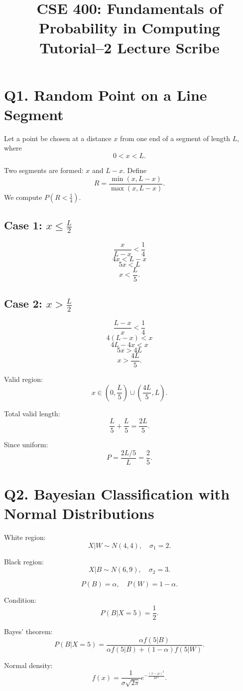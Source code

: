 \documentclass[12pt]{article}
\title{CSE 400: Fundamentals of Probability in Computing\\
Tutorial--2 Lecture Scribe}
\date{}
\begin{document}
\maketitle

\section*{Q1. Random Point on a Line Segment}

Let a point be chosen at a distance $x$ from one end of a segment of length $L$, where
\[
0 < x < L.
\]

Two segments are formed: $x$ and $L-x$. Define
\[
R = \frac{\min(x,L-x)}{\max(x,L-x)}.
\]
We compute $P\left(R < \frac14\right)$.

\subsection*{Case 1: $x \le \frac{L}{2}$}
\[
\frac{x}{L-x} < \frac14
\]
\[
4x < L-x
\]
\[
5x < L
\]
\[
x < \frac{L}{5}.
\]

\subsection*{Case 2: $x > \frac{L}{2}$}
\[
\frac{L-x}{x} < \frac14
\]
\[
4(L-x) < x
\]
\[
4L - 4x < x
\]
\[
5x > 4L
\]
\[
x > \frac{4L}{5}.
\]

Valid region:
\[
x \in \left(0,\frac{L}{5}\right) \cup \left(\frac{4L}{5},L\right).
\]

Total valid length:
\[
\frac{L}{5} + \frac{L}{5} = \frac{2L}{5}.
\]

Since uniform:
\[
P = \frac{2L/5}{L} = \frac{2}{5}.
\]

\section*{Q2. Bayesian Classification with Normal Distributions}

White region:
\[
X|W \sim N(4,4), \quad \sigma_1 = 2.
\]

Black region:
\[
X|B \sim N(6,9), \quad \sigma_2 = 3.
\]

\[
P(B)=\alpha, \quad P(W)=1-\alpha.
\]

Condition:
\[
P(B|X=5)=\frac12.
\]

Bayes' theorem:
\[
P(B|X=5)=\frac{\alpha f(5|B)}{\alpha f(5|B)+(1-\alpha)f(5|W)}.
\]

Normal density:
\[
f(x)=\frac{1}{\sigma\sqrt{2\pi}} e^{-\frac{(x-\mu)^2}{2\sigma^2}}.
\]
\end{document}
